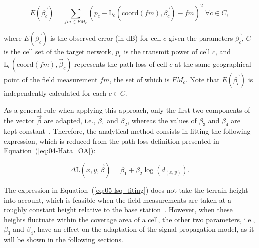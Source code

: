 \begin{equation}
E(\vec{\beta_{c}})=\sum_{fm\in FM_{c}}(p_{c}-\mathrm{L}{}_{c}(\mathrm{coord}(fm),\vec{\beta_{c}})-fm)^{2}\;\forall c\in C,\label{eq:05-Least_squares_error}
\end{equation}


\noindent where $E(\vec{\beta_{c}})$ is the observed error (in dB)
for cell $c$ given the parameters $\vec{\beta_{c}}$, $C$ is the
cell set of the target network, $p_{c}$ is the transmit power of
cell $c$, and $\mathrm{L}{}_{c}(\mathrm{coord}(fm),\vec{\beta}_{c})$
represents the path loss of cell $c$ at the same geographical point
of the field measurement $fm$, the set of which is $FM_{c}$.
Note that $E(\vec{\beta_{c}})$ is independently calculated for each
$c\in C$.

As a general rule when applying this approach, only the first two
components of the vector $\vec{\beta}$ are adapted, i.e., $\beta_{1}$
and $\beta_{2}$, whereas the values of $\beta_{3}$ and $\beta_{4}$
are kept constant~\cite{Huang_Online_propagation_model_correction_based_on_PSO_algorithm_in_LTE_SON_system:2012,Yang_A_linear_least_square_method_of_propagation_model_tuning_for_3G_radion_network_planning:2008}.
Therefore, the analytical method consists in fitting the following
expression, which is reduced from the path-loss definition presented
in Equation~(\ref{eq:04-Hata_OA}):

\begin{equation}
\Delta\mathrm{L}(x,y,\vec{\beta})=\beta_{1}+\beta_{2}\log(d_{(x,y)}).\label{eq:05-lsq_fiting}
\end{equation}


\noindent The expression in Equation~(\ref{eq:05-lsq_fiting}) does
not take the terrain height into account, which is feasible when the
field measurements are taken at a roughly constant height relative
to the base station~\cite{Aarnaes-Tuning_of_empirical_radio_propagation_models_effect_of_location_accuracy:2004,Dalela-Tuning_of_COST_model_for_radio_wave_propagation_predictions:2012,Huang_Online_propagation_model_correction_based_on_PSO_algorithm_in_LTE_SON_system:2012,Yang_A_linear_least_square_method_of_propagation_model_tuning_for_3G_radion_network_planning:2008}.
However, when these heights fluctuate within the coverage area of
a cell, the other two parameters, i.e., $\beta_{3}$ and $\beta_{4}$,
have an effect on the adaptation of the signal-propagation model,
as it will be shown in the following sections.


